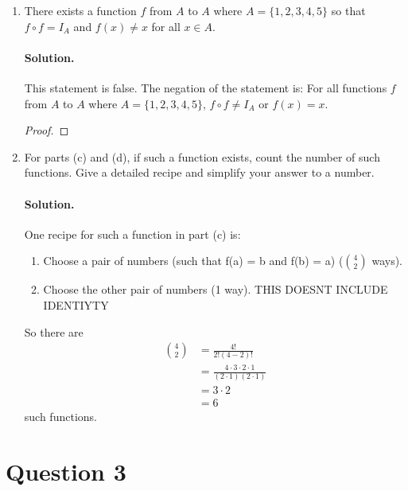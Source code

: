 \documentclass[12pt]{article}
\begin{document}
\begin{enumerate}[label=\textbf{\alph*.}]
\begin{proof}
    Let $f = \{(1,4), (2,3), (3,2), (4,1)\}$. Then $$f \circ f = \{(1,1), (2,2), (3,3), (4,4), (5,5)\} = I_A$$ And $1 \neq 4, 2 \neq 3, 3 \neq 2, 4 \neq 1$, so $\forall x \in A, f(x) \neq x$.
\end{proof}


\item There exists a function $f$ from $A$ to $A$ where $A = \{1, 2, 3, 4, 5\}$ so that $f \circ f = I_A$ and $f(x) \neq x$ for all $x \in A$.
\paragraph*{Solution.} This statement is false. The negation of the statement is: For all functions $f$ from $A$ to $A$ where $A = \{1, 2, 3, 4, 5\}$, $f \circ f \neq I_A$ or $f(x) = x$.

\begin{proof}
    
\end{proof}

\item For parts (c) and (d), if such a function exists, count the number of such functions. Give a detailed recipe and simplify your answer to a number.
\paragraph*{Solution.} One recipe for such a function in part (c) is:
\begin{enumerate}
    \item Choose a pair of numbers (such that f(a) = b and f(b) = a) ($4\choose2$ ways).
    \item Choose the other pair of numbers (1 way). THIS DOESNT INCLUDE IDENTIYTY
\end{enumerate}
So there are 
\begin{align*}
    4\choose2 &= \frac{4!}{2!(4-2)!}\\
    &= \frac{4 \cdot 3 \cdot 2 \cdot 1}{(2 \cdot 1)(2 \cdot 1)}\\
    &= 3 \cdot 2 \\
    &= 6 
\end{align*}
such functions.

\end{enumerate}






\section*{Question 3}
\end{document}
